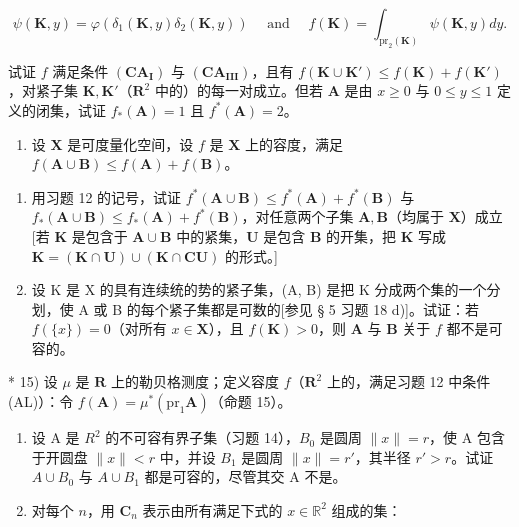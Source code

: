 \[
\psi (\mathbf {K}, y) = \varphi (\delta_ {1} (\mathbf {K}, y) \delta_ {2} (\mathbf {K}, y)) \quad \text { and } \quad f (\mathbf {K}) = \int_ {\mathrm{pr} _ {2} (\mathbf {K})} \psi (\mathbf {K}, y) d y.
\]

试证 \(f\) 满足条件 \((\mathbf{CA}_{\mathbf{I}})\) 与 \((\mathbf{CA}_{\mathbf{III}})\)，且有 \(f(\mathbf{K} \cup \mathbf{K}') \leqslant f(\mathbf{K}) + f(\mathbf{K}')\)，对紧子集 \(\mathbf{K}, \mathbf{K}'\)（\(\mathbf{R}^2\) 中的）的每一对成立。但若 \(\mathbf{A}\) 是由 \(x \geqslant 0\) 与 \(0 \leqslant y \leqslant 1\) 定义的闭集，试证 \(f_*(\mathbf{A}) = 1\) 且 \(f^*(\mathbf{A}) = 2\)。

\begin{enumerate}
\def\labelenumi{\arabic{enumi})}
\setcounter{enumi}{13}
\tightlist
\item
  设 \(\mathbf{X}\) 是可度量化空间，设 \(f\) 是 \(\mathbf{X}\) 上的容度，满足 \(f(\mathbf{A} \cup \mathbf{B}) \leqslant f(\mathbf{A}) + f(\mathbf{B})\)。
\end{enumerate}

\begin{enumerate}
\def\labelenumi{\alph{enumi})}
\item
  用习题 12 的记号，试证 \(f^{*}(\mathbf{A} \cup \mathbf{B}) \leqslant f^{*}(\mathbf{A}) + f^{*}(\mathbf{B})\) 与 \(f_{*}(\mathbf{A} \cup \mathbf{B}) \leqslant f_{*}(\mathbf{A}) + f^{*}(\mathbf{B})\)，对任意两个子集 \(\mathbf{A}, \mathbf{B}\)（均属于 \(\mathbf{X}\)）成立{[}若 \(\mathbf{K}\) 是包含于 \(\mathbf{A} \cup \mathbf{B}\) 中的紧集，\(\mathbf{U}\) 是包含 \(\mathbf{B}\) 的开集，把 \(\mathbf{K}\) 写成 \(\mathbf{K} = (\mathbf{K} \cap \mathbf{U}) \cup (\mathbf{K} \cap \mathbf{C}\mathbf{U})\) 的形式。{]}
\item
  设 K 是 X 的具有连续统的势的紧子集，(A, B) 是把 K 分成两个集的一个分划，使 A 或 B 的每个紧子集都是可数的{[}参见 § 5 习题 18 d){]}。试证：若 \(f(\{x\}) = 0\)（对所有 \(x \in \mathbf{X}\)），且 \(f(\mathbf{K}) > 0\)，则 \(\mathbf{A}\) 与 \(\mathbf{B}\) 关于 \(f\) 都不是可容的。
\end{enumerate}

* 15) 设 \(\mu\) 是 \(\mathbf{R}\) 上的勒贝格测度；定义容度 \(f\)（\(\mathbf{R}^2\) 上的，满足习题 12 中条件 (AL)）：令 \(f(\mathbf{A}) = \mu^{*}(\mathrm{pr}_{1}\mathbf{A})\)（命题 15）。

\begin{enumerate}
\def\labelenumi{\alph{enumi})}
\item
  设 A 是 \(R^{2}\) 的不可容有界子集（习题 14），\(B_{0}\) 是圆周 \(\|x\| = r\)，使 A 包含于开圆盘 \(\|x\| < r\) 中，并设 \(B_{1}\) 是圆周 \(\|x\| = r'\)，其半径 \(r' > r\)。试证 \(A \cup B_{0}\) 与 \(A \cup B_{1}\) 都是可容的，尽管其交 A 不是。
\item
  对每个 \(n\)，用 \(\mathbf{C}_n\) 表示由所有满足下式的 \(x \in \mathbb{R}^2\) 组成的集：
\end{enumerate}

